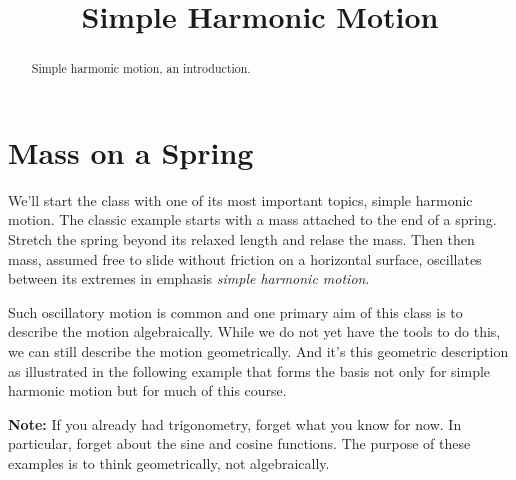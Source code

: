 \documentclass{ximera}
\title{Simple Harmonic Motion}
\begin{document}
\begin{abstract}
Simple harmonic motion, an introduction.
\end{abstract}
\maketitle

\section{Mass on a Spring}

We'll start the class with one of its most important topics, simple harmonic motion. The classic example starts with a mass attached to the end of a spring. Stretch the spring beyond its relaxed length and relase the mass. Then then mass, assumed free to slide without friction on a horizontal surface, oscillates between its extremes in emphasis \emph{simple harmonic motion}.

Such oscillatory motion is common and one primary aim of this class is to describe the motion algebraically. While we do not yet have the tools to do this, we can still describe the motion geometrically. And it's this geometric description as illustrated in the following example that forms the basis not only for simple harmonic motion but for much of this course.

{\bf Note:} If you already had trigonometry, forget what you know for now. In particular, forget about the sine and cosine functions. The purpose of these examples is to think geometrically, not algebraically.
\end{document}

